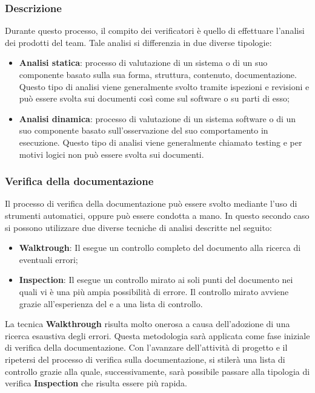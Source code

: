\subsubsection{Descrizione}
Durante questo processo, il compito dei verificatori è quello di effettuare l'analisi dei prodotti del team. Tale analisi si differenzia in due diverse tipologie:
\begin{itemize}
    \item \textbf{Analisi statica}: processo di valutazione di un sistema o di un suo componente basato sulla sua forma, struttura, contenuto, documentazione. Questo tipo di analisi viene generalmente svolto tramite ispezioni e revisioni e può essere svolta sui documenti così come sul software o su parti di esso;
    \item \textbf{Analisi dinamica}: processo di valutazione di un sistema software o di un suo componente basato sull'osservazione del suo comportamento in esecuzione. Questo tipo di analisi viene generalmente chiamato testing e per motivi logici non può essere svolta sui documenti.
\end{itemize}

\subsubsection{Verifica della documentazione}
Il processo di verifica della documentazione può essere svolto mediante l'uso di strumenti automatici, oppure può essere condotta a mano. In questo secondo caso si possono utilizzare due diverse tecniche di analisi descritte nel seguito:
\begin{itemize}
    \item \textbf{Walktrough}: Il \roleVerifierLow{} esegue un controllo completo del documento alla ricerca di eventuali errori;
    \item \textbf{Inspection}: Il \roleVerifierLow{} esegue un controllo mirato ai soli punti del documento nei quali vi è una più ampia possibilità di errore. Il controllo mirato avviene grazie all'esperienza del \roleVerifierLow{} e a una lista di controllo\glo{}.
\end{itemize}
La tecnica \textbf{Walkthrough} risulta molto onerosa a causa dell'adozione di una ricerca esaustiva degli errori. Questa metodologia sarà applicata come fase iniziale di verifica della documentazione. Con l'avanzare dell'attività di progetto e il ripetersi del processo di verifica sulla documentazione, si stilerà una lista di controllo\glo{} grazie alla quale, successivamente, sarà possibile passare alla tipologia di verifica \textbf{Inspection} che risulta essere più rapida.

